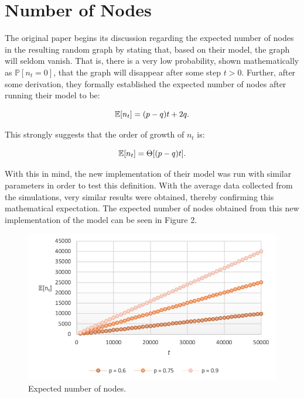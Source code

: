 \documentclass[final,3p,times,twocolumn]{elsarticle}
\begin{document}
\section{Number of Nodes}
\label{S:4}

The original paper begins its discussion regarding the expected number of nodes in the resulting random graph by stating that, based on their model, the graph will seldom vanish. That is, there is a very low probability, shown mathematically as $\mathbb{P}[n_t = 0]$, that the graph will disappear after some step $t > 0$. 
Further, after some derivation, they formally established the expected number of nodes after running their model to be:

\begin{equation}
\centering
    \mathbb{E}[n_t] = (p - q)t + 2q.
\end{equation}

This strongly suggests that the order of growth of $n_t$ is:

\begin{equation}
\centering
    \mathbb{E}[n_t] = \Theta[(p - q)t].
\end{equation}

With this in mind, the new implementation of their model was run with similar parameters in order to test this definition. With the average data collected from the simulations, very similar results were obtained, thereby confirming this mathematical expectation. The expected number of nodes obtained from this new implementation of the model can be seen in Figure 2.

\begin{figure}[h]
\centering\includegraphics[width=1\linewidth]{nodes.png}
\caption{Expected number of nodes.}
\end{figure}
\end{document}
